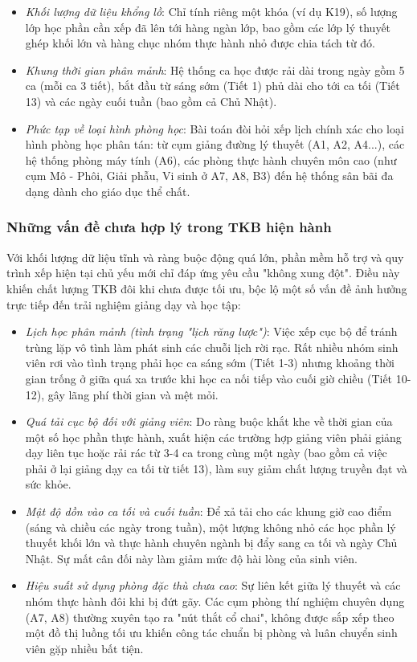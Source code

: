 \documentclass[a4paper,12pt,oneside]{article}
\begin{document}
	\begin{itemize}
		\item \textit{Khối lượng dữ liệu khổng lồ}: Chỉ tính riêng một khóa (ví dụ K19), số lượng lớp học phần cần xếp đã lên tới hàng ngàn lớp, bao gồm các lớp lý thuyết ghép khối lớn và hàng chục nhóm thực hành nhỏ được chia tách từ đó.
		\item \textit{Khung thời gian phân mảnh}: Hệ thống ca học được rải dài trong ngày gồm 5 ca (mỗi ca 3 tiết), bắt đầu từ sáng sớm (Tiết 1) phủ dài cho tới ca tối (Tiết 13) và các ngày cuối tuần (bao gồm cả Chủ Nhật). 
		\item \textit{Phức tạp về loại hình phòng học}: Bài toán đòi hỏi xếp lịch chính xác cho loại hình phòng học phân tán: từ cụm giảng đường lý thuyết (A1, A2, A4...), các hệ thống phòng máy tính (A6), các phòng thực hành chuyên môn cao (như cụm Mô - Phôi, Giải phẫu, Vi sinh ở A7, A8, B3) đến hệ thống sân bãi đa dạng dành cho giáo dục thể chất.
	\end{itemize}
	
	\subsubsection{Những vấn đề chưa hợp lý trong TKB hiện hành}
	
	Với khối lượng dữ liệu tĩnh và ràng buộc động quá lớn, phần mềm hỗ trợ và quy trình xếp hiện tại chủ yếu mới chỉ đáp ứng yêu cầu "không xung đột". Điều này khiến chất lượng TKB đôi khi chưa được tối ưu, bộc lộ một số vấn đề ảnh hưởng trực tiếp đến trải nghiệm giảng dạy và học tập:
	
	\begin{itemize}
		\item \textit{Lịch học phân mảnh (tình trạng "lịch răng lược")}: Việc xếp cục bộ để tránh trùng lặp vô tình làm phát sinh các chuỗi lịch rời rạc. Rất nhiều nhóm sinh viên rơi vào tình trạng phải học ca sáng sớm (Tiết 1-3) nhưng khoảng thời gian trống ở giữa quá xa trước khi học ca nối tiếp vào cuối giờ chiều (Tiết 10-12), gây lãng phí thời gian và mệt mỏi.
		\item \textit{Quá tải cục bộ đối với giảng viên}: Do ràng buộc khắt khe về thời gian của một số học phần thực hành, xuất hiện các trường hợp giảng viên phải giảng dạy liên tục hoặc rải rác từ 3-4 ca trong cùng một ngày (bao gồm cả việc phải ở lại giảng dạy ca tối từ tiết 13), làm suy giảm chất lượng truyền đạt và sức khỏe.
		\item \textit{Mật độ dồn vào ca tối và cuối tuần}: Để xả tải cho các khung giờ cao điểm (sáng và chiều các ngày trong tuần), một lượng không nhỏ các học phần lý thuyết khối lớn và thực hành chuyên ngành bị đẩy sang ca tối và ngày Chủ Nhật. Sự mất cân đối này làm giảm mức độ hài lòng của sinh viên.
		\item \textit{Hiệu suất sử dụng phòng đặc thù chưa cao}: Sự liên kết giữa lý thuyết và các nhóm thực hành đôi khi bị đứt gãy. Các cụm phòng thí nghiệm chuyên dụng (A7, A8) thường xuyên tạo ra "nút thắt cổ chai", không được sắp xếp theo một đồ thị luồng tối ưu khiến công tác chuẩn bị phòng và luân chuyển sinh viên gặp nhiều bất tiện.
	\end{itemize}
	
\end{document}
